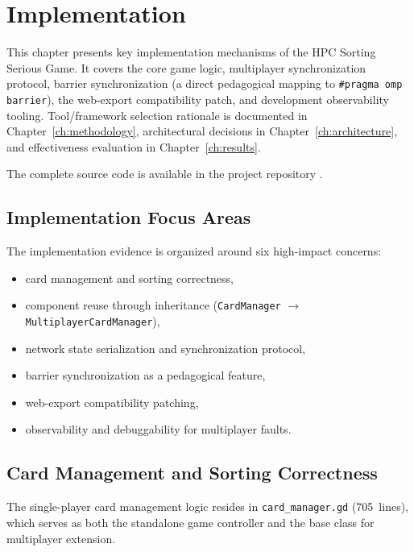 \chapter{Implementation}
\label{ch:implementation}

This chapter presents key implementation mechanisms of the HPC Sorting Serious Game. It covers the core game logic, multiplayer synchronization protocol, barrier synchronization (a direct pedagogical mapping to \texttt{\#pragma omp barrier}), the web-export compatibility patch, and development observability tooling. Tool/framework selection rationale is documented in Chapter~\ref{ch:methodology}, architectural decisions in Chapter~\ref{ch:architecture}, and effectiveness evaluation in Chapter~\ref{ch:results}.

The complete source code is available in the project repository \citep{github_project}.

\section{Implementation Focus Areas}
\label{sec:impl-core-components}

The implementation evidence is organized around six high-impact concerns:
\begin{itemize}
    \item card management and sorting correctness,
    \item component reuse through inheritance (\texttt{CardManager} $\to$ \texttt{MultiplayerCardManager}),
    \item network state serialization and synchronization protocol,
    \item barrier synchronization as a pedagogical feature,
    \item web-export compatibility patching,
    \item observability and debuggability for multiplayer faults.
\end{itemize}

\section{Card Management and Sorting Correctness}
\label{sec:singleplayer-implementation}

The single-player card management logic resides in \texttt{card\_manager.gd} (705~lines), which serves as both the standalone game controller and the base class for multiplayer extension.

